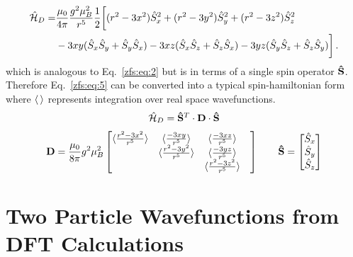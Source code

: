 \begin{align}
    \mathcal{\hat{H}}_D =& \frac{\mu_0}{4\pi}\frac{g^2\mu_B^2}{r^5}\frac{1}{2}\bigg[ (r^2-3x^2)\hat{S}_{x}^2
    + (r^2-3y^2)\hat{S}_{y}^2 + (r^2-3z^2)\hat{S}_{z}^2 \label{zfs:eq:5} \\
    & - 3xy(\hat{S}_{x}\hat{S}_{y}+\hat{S}_{y}\hat{S}_{x}) - 3xz(\hat{S}_{x}\hat{S}_{z}+\hat{S}_{z}\hat{S}_{x})
    - 3yz(\hat{S}_{y}\hat{S}_{z}+\hat{S}_{z}\hat{S}_{y}) \bigg] \nonumber \, .
\end{align}
which is analogous to Eq.~\ref{zfs:eq:2} but is in terms of a single spin operator $\mathbf{\hat{S}}$. Therefore Eq.~\ref{zfs:eq:5} can be converted into a typical spin-hamiltonian form where $\braket{\,}$ represents integration over real space wavefunctions.
\begin{align}
    \mathcal{\hat{H}}_D = \mathbf{\hat{S}}^{T}\cdot\mathbf{D}\cdot\mathbf{\hat{S}}
    \label{zfs:eq:6}
\end{align}
\begin{align}
    \mathbf{D} = \frac{\mu_0}{8\pi}g^2\mu_B^2
        \begin{bmatrix}
        \braket{\frac{r^2-3x^2}{r^5}} &
        \braket{\frac{-3xy}{r^5}}     &
        \braket{\frac{-3xz}{r^5}}     \\
        &
        \braket{\frac{r^2-3y^2}{r^5}} &
        \braket{\frac{-3yz}{r^5}}     \\
        &
        &
        \braket{\frac{r^2-3z^2}{r^5}} &
        \end{bmatrix}
    \quad \quad
    \mathbf{\hat{S}} =
    \begin{bmatrix}
    \hat{S}_{x} \\
    \hat{S}_{y} \\
    \hat{S}_{z}
    \end{bmatrix}
    \label{zfs:eq:7}
\end{align}


\section{Two Particle Wavefunctions from DFT Calculations}


